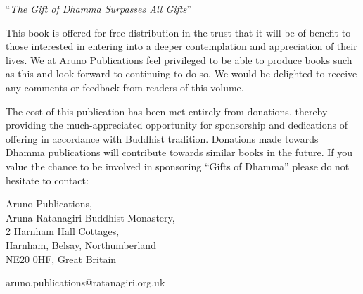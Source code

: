 \begin{quotepage}{0.9\textwidth}
\centering
``\emph{The Gift of Dhamma Surpasses All Gifts}''\\[0.2\baselineskip]
\smaller
{}


This book is offered for free distribution in the trust that it will be of
benefit to those interested in entering into a deeper contemplation and
appreciation of their lives. We at Aruno Publications feel privileged to be
able to produce books such as this and look forward to continuing to do so. We
would be delighted to receive any comments or feedback from readers of this
volume.

The cost of this publication has been met entirely from donations, thereby
providing the much-appreciated opportunity for sponsorship and dedications of
offering in accordance with Buddhist tradition.  Donations made towards Dhamma
publications will contribute towards similar books in the future.  If you value
the chance to be involved in sponsoring ``Gifts of Dhamma'' please do not
hesitate to contact:

Aruno Publications,\\
Aruna Ratanagiri Buddhist Monastery,\\
2 Harnham Hall Cottages,\\
Harnham, Belsay, Northumberland\\
NE20 0HF, Great Britain\\

\bigskip

aruno.publications@ratanagiri.org.uk
\end{quotepage}


